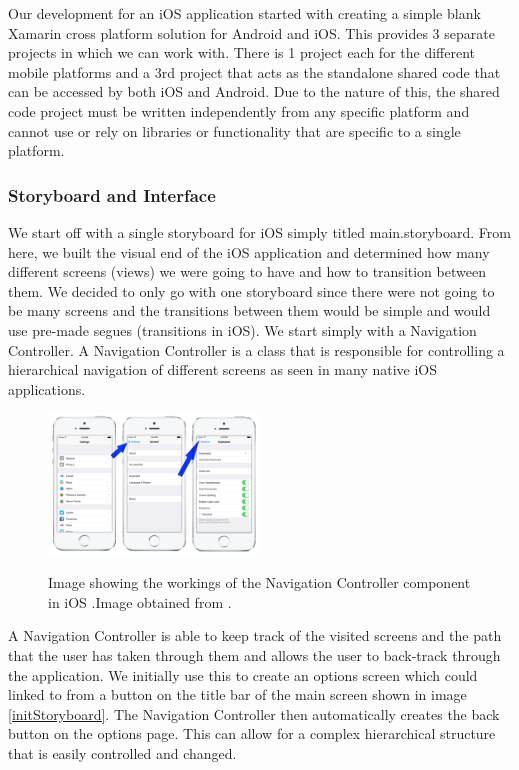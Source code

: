\documentclass[12pt,a4paper]{report}
\begin{document}
Our development for an iOS application started with creating a simple blank Xamarin cross platform solution for Android and iOS. This provides 3 separate projects in which we can work with. There is 1 project each for the different mobile platforms and a 3rd project that acts as the standalone shared code that can be accessed by both iOS and Android. Due to the nature of this, the shared code project must be written independently from any specific platform and cannot use or rely on libraries or functionality that are specific to a single platform.

\subsubsection{Storyboard and Interface}
We start off with a single storyboard for iOS simply titled main.storyboard. From here, we built the visual end of the iOS application and determined how many different screens (views) we were going to have and how to transition between them. We decided to only go with one storyboard since there were not going to be many screens and the transitions between them would be simple and would use pre-made segues (transitions in iOS). We start simply with a Navigation Controller. A Navigation Controller is a class that is responsible for controlling a hierarchical navigation of different screens as seen in many native iOS applications.

\begin{figure}[]
\centering
\includegraphics[width=0.5\textwidth]{images-implementation/NavigationController.png}
\label{NavigationController}
\caption{Image showing the workings of the Navigation Controller component in iOS .Image obtained from \cite{iosnavigxtioncontroller}.}
\end{figure}

A Navigation Controller is able to keep track of the visited screens and the path that the user has taken through them and allows the user to back-track through the application. We initially use this to create an options screen which could linked to from a button on the title bar of the main screen shown in image \ref{initStoryboard}. The Navigation Controller then automatically creates the back button on the options page. This can allow for a complex hierarchical structure that is easily controlled and changed.
\end{document}

